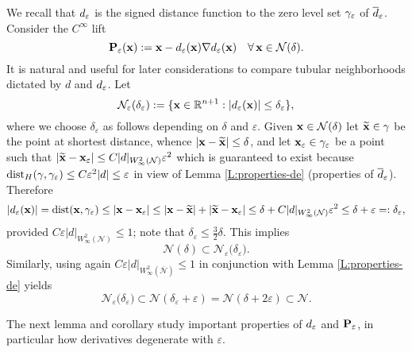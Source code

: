 %
We recall that 
$d_\varepsilon$ is the signed distance function to the zero level set ${\gamma_\varepsilon}$ of $\overline{d}_\varepsilon$.
Consider the $C^\infty$ lift
%
\begin{equation}\label{eps-lift}
{{\bf P}_\varepsilon}({\bf x}) := {\bf x} - d_\varepsilon({\bf x}) \nabla d_\varepsilon({\bf x})
\quad\forall \, {\bf x}\in{\mathcal N(\delta)}.
\end{equation}
%
It is natural and useful for later considerations to compare tubular neighborhoods
dictated by $d$ and $d_\varepsilon$. Let
%
\[
{\mathcal{N}}_\varepsilon({\delta_\varepsilon}) :=
\{{\bf x}\in\mathbb{R}^{n+1}:  |d_\varepsilon({\bf x})| \le {\delta_\varepsilon} \},
\]
%
where we choose $\delta_\varepsilon$ as follows depending
on $\delta$ and $\varepsilon$.
Given ${\bf x}\in{\mathcal N(\delta)}$ let $\widetilde{{\bf x}}\in\gamma$ be the point at shortest distance,
whence $|{\bf x}-\widetilde{{\bf x}}|\le\delta$, and let ${\bf x}_{\varepsilon}\in{\gamma_\varepsilon}$ be a point such that
$|\widetilde{{\bf x}}-{\bf x}_{\varepsilon}|\le C |d|_{W^2_\infty(\mathcal N)}\varepsilon^2$ which is guaranteed to exist
because ${\rm dist}_H(\gamma, \gamma_\varepsilon) \le C \varepsilon^2|d| \le \varepsilon$
in view of Lemma \ref{L:properties-de} (properties of $\overline{d}_\varepsilon$). Therefore
%
\[
|d_\varepsilon({\bf x})| = \operatorname{dist}({\bf x},{\gamma_\varepsilon}) \le |{\bf x}-{\bf x}_{\varepsilon}| \le |{\bf x}-\widetilde{{\bf x}}| + |\widetilde{{\bf x}}-{\bf x}_{\varepsilon}|
\le \delta + C|d|_{W^2_\infty(\mathcal N)}\varepsilon^2
\le \delta + \varepsilon =: {\delta_\varepsilon} ,
\]
provided $C\varepsilon|d|_{W^2_\infty(\mathcal N)}\le1$; note that
${\delta_\varepsilon} \le \frac32 \delta$. This implies
%
\begin{equation}\label{e:Ntilde}
  {\mathcal N(\delta)}\subset {\mathcal{N}}_\varepsilon\big( {\delta_\varepsilon} \big).
\end{equation}
%
Similarly, using again $C \varepsilon |d|_{W_\infty^2(\overline{\mathcal{N}})} \le 1$
in conjunction with Lemma \ref{L:properties-de} yields
%
\[
{\mathcal{N}}_\varepsilon\big( {\delta_\varepsilon} \big) \subset \mathcal{N}({\delta_\varepsilon}+\varepsilon)=\mathcal{N}(\delta + 2 \varepsilon) \subset \mathcal{N}.
\]

The next lemma and corollary study important properties of $d_\varepsilon$ and ${{\bf P}_\varepsilon}$,
in particular how derivatives degenerate with $\varepsilon$.


